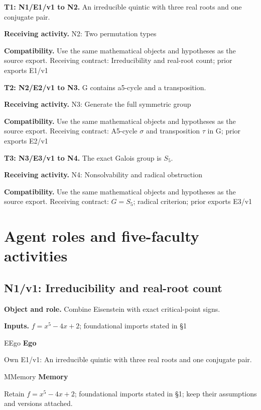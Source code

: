 \documentclass[preprint,12pt,aps,pra,showkeys,amsmath,amssymb,superscriptaddress,floatfix]{revtex4-2}
\theoremstyle{definition}
\theoremstyle{remark}
\newcommand{\mmfaculty}[3]{%
 \begin{mmfacultybox}{#1}{#2}
 {\sffamily\bfseries\color{MMBlue}#2}\par\smallskip #3
 \end{mmfacultybox}}
\newcommand{\field}[2]{\par\smallskip\noindent\textbf{#1.} #2\par}
\begin{document}
\begingroup\small\linespread{1.05}\selectfont

\field{T1: N1/E1/v1 to N2}{An irreducible quintic with three real roots and one conjugate pair.}

\field{Receiving activity}{N2: Two permutation types}

\field{Compatibility}{Use the same mathematical objects and hypotheses as the source export.
Receiving contract: Irreducibility and real-root count; prior exports
E1/v1}

\field{T2: N2/E2/v1 to N3}{G contains a5-cycle and a transposition.}

\field{Receiving activity}{N3: Generate the full symmetric group}

\field{Compatibility}{Use the same mathematical objects and hypotheses as the source export.
Receiving contract: A5-cycle \(\sigma\) and transposition \(\tau\) in G;
prior exports E2/v1}

\field{T3: N3/E3/v1 to N4}{The exact Galois group is \(S_{5}\).}

\field{Receiving activity}{N4: Nonsolvability and radical obstruction}

\field{Compatibility}{Use the same mathematical objects and hypotheses as the source export.
Receiving contract: \(G=S_{5}\); radical criterion; prior exports E3/v1}

\endgroup

\clearpage\section{Agent roles and five-faculty activities}\begingroup\small\linespread{1.05}\selectfont{}

\subsection{N1/v1: Irreducibility and real-root count}

\field{Object and role}{Combine Eisenstein with exact critical-point signs.}

\field{Inputs}{\(f=x^{5}-4x+2\); foundational imports stated in §1}

\mmfaculty{E}{Ego}{Own E1/v1: An irreducible quintic with three real roots and one
conjugate pair.}

\mmfaculty{M}{Memory}{Retain \(f=x^{5}-4x+2\); foundational imports stated in §1; keep their
assumptions and versions attached.}
\end{document}
